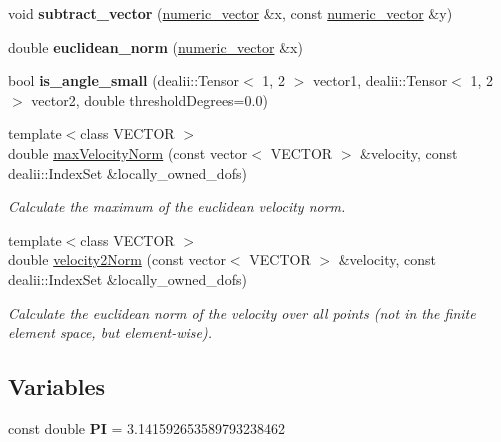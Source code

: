 \begin{DoxyCompactItemize}
\item 
\hypertarget{namespacenatrium_1_1Math_aa836548ce124ae68fe267d0c988add9b}{
void {\bfseries subtract\_\-vector} (\hyperlink{namespacenatrium_a67c39077adc6634f8fa3762b8eef24c4}{numeric\_\-vector} \&x, const \hyperlink{namespacenatrium_a67c39077adc6634f8fa3762b8eef24c4}{numeric\_\-vector} \&y)}
\label{namespacenatrium_1_1Math_aa836548ce124ae68fe267d0c988add9b}

\item 
\hypertarget{namespacenatrium_1_1Math_a3fbf64e851a081a568d1fce928380074}{
double {\bfseries euclidean\_\-norm} (\hyperlink{namespacenatrium_a67c39077adc6634f8fa3762b8eef24c4}{numeric\_\-vector} \&x)}
\label{namespacenatrium_1_1Math_a3fbf64e851a081a568d1fce928380074}

\item 
\hypertarget{namespacenatrium_1_1Math_a5e27b57b0c8ef5db261c6fd6cc7f8b08}{
bool {\bfseries is\_\-angle\_\-small} (dealii::Tensor$<$ 1, 2 $>$ vector1, dealii::Tensor$<$ 1, 2 $>$ vector2, double thresholdDegrees=0.0)}
\label{namespacenatrium_1_1Math_a5e27b57b0c8ef5db261c6fd6cc7f8b08}

\item 
{\footnotesize template$<$class VECTOR $>$ }\\double \hyperlink{namespacenatrium_1_1Math_afdfb0b93daae2db1221dc22e268c631d}{maxVelocityNorm} (const vector$<$ VECTOR $>$ \&velocity, const dealii::IndexSet \&locally\_\-owned\_\-dofs)
\begin{DoxyCompactList}\small\item\em Calculate the maximum of the euclidean velocity norm. \item\end{DoxyCompactList}\item 
{\footnotesize template$<$class VECTOR $>$ }\\double \hyperlink{namespacenatrium_1_1Math_ac6abc916cc66dda84a4e5c28e61be560}{velocity2Norm} (const vector$<$ VECTOR $>$ \&velocity, const dealii::IndexSet \&locally\_\-owned\_\-dofs)
\begin{DoxyCompactList}\small\item\em Calculate the euclidean norm of the velocity over all points (not in the finite element space, but element-\/wise). \item\end{DoxyCompactList}\end{DoxyCompactItemize}
\subsection*{Variables}
\begin{DoxyCompactItemize}
\item 
\hypertarget{namespacenatrium_1_1Math_a1ef5edf004cf147f3b3e9d36a7af4b00}{
const double {\bfseries PI} = 3.141592653589793238462}
\label{namespacenatrium_1_1Math_a1ef5edf004cf147f3b3e9d36a7af4b00}

\end{DoxyCompactItemize}


